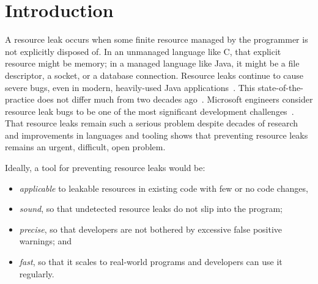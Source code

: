 \section{Introduction}
\label{sec:intro}


A resource leak occurs when some finite resource managed by the
programmer is not explicitly disposed of. In an unmanaged language
like C, that explicit resource might be memory; in a managed language
like Java, it might be a file descriptor, a socket, or a database
connection.  Resource leaks continue to cause severe bugs, even in
modern, heavily-used Java applications~\cite{ghanavati2020memory}.
This state-of-the-practice does not differ much from two decades
ago~\cite{WeimerN04}. 
Microsoft engineers consider resource leak bugs to be one of the most
significant development challenges~\cite{LoNZ2015}.  That
resource leaks remain such a serious problem despite decades of
research and improvements in languages and tooling shows that
preventing resource leaks remains an urgent, difficult, open problem.


Ideally, a tool for preventing resource leaks would be:
\begin{itemize}
\item \emph{applicable} to leakable resources in existing code with few or no code changes,
\item \emph{sound}, so that undetected resource leaks do not slip into
  the program;
\item \emph{precise}, so that developers are not bothered by excessive false positive
  warnings; and
\item \emph{fast}, so that it scales to real-world programs and
  developers can use it regularly.
\end{itemize}


